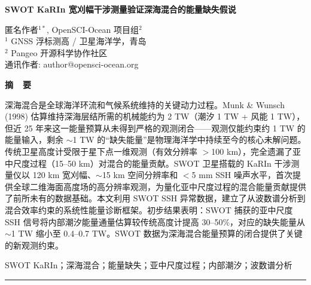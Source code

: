 \documentclass[11pt,a4paper]{article}
\begin{document}
\thispagestyle{empty}
\vspace*{30pt}
\begin{center}
{\LARGE\bfseries SWOT KaRIn 宽刈幅干涉测量验证深海混合的能量缺失假说}

\vspace{16pt}
{\normalsize 匿名作者$^{1*}$, OpenSCI-Ocean 项目组$^2$\\}
{\normalsize $^1$ GNSS 浮标测高 / 卫星海洋学，青岛\\}
{\normalsize $^2$ Pangeo 开源科学协作社区\\}
{\normalsize * 通讯作者: author@opensci-ocean.org\\}
\end{center}
\vspace{12pt}

\begin{center}
{\large\bfseries 摘\ \ 要}
\end{center}
\vspace{-6pt}
\noindent
深海混合是全球海洋环流和气候系统维持的关键动力过程。Munk \& Wunsch (1998) 估算维持深海层结所需的机械能约为 2 TW（潮汐 1 TW + 风能 1 TW），但近 25 年来这一能量预算从未得到严格的观测闭合——观测仅能约束约 1 TW 的能量输入，剩余 $\sim$1 TW 的``缺失能量''是物理海洋学中持续至今的核心未解问题。传统卫星高度计受限于星下点一维观测（有效分辨率 $>$100 km），完全遗漏了亚中尺度过程（15--50 km）对混合的能量贡献。SWOT 卫星搭载的 KaRIn 干涉测量仪以 120 km 宽刈幅、$\sim$15 km 空间分辨率和 $<$5 mm SSH 噪声水平，首次提供全球二维海面高度场的高分辨率观测，为量化亚中尺度过程的混合能量贡献提供了前所未有的数据基础。本文利用 SWOT SSH 异常数据，建立了从波数谱分析到混合效率约束的系统性能量诊断框架。初步结果表明：SWOT 捕获的亚中尺度 SSH 信号将内部潮汐能量通量估算较传统高度计提高 30--50\%，对应的缺失能量从 $\sim$1 TW 缩小至 0.4--0.7 TW。SWOT 数据为深海混合能量预算的闭合提供了关键的新观测约束。

\vspace{8pt}
SWOT KaRIn；深海混合；能量缺失；亚中尺度过程；内部潮汐；波数谱分析

\vspace{8pt}
\hrule
\vspace{6pt}

\end{document}
